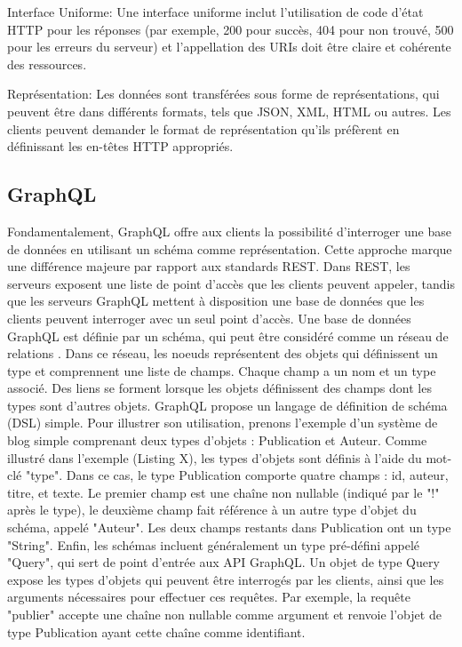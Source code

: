 Interface Uniforme: Une interface uniforme inclut l'utilisation de code d'état HTTP pour les réponses (par exemple, 200 pour succès, 404 pour non trouvé, 500 pour les erreurs du serveur) et l'appellation des URIs doit être claire et cohérente des ressources.

Représentation: Les données sont transférées sous forme de représentations, qui peuvent être dans différents formats, tels que JSON, XML, HTML ou autres. Les clients peuvent demander le format de représentation qu'ils préfèrent en définissant les en-têtes HTTP appropriés.

\subsection{GraphQL}

Fondamentalement, GraphQL offre aux clients la possibilité d'interroger une base de données en utilisant un schéma comme représentation. Cette approche marque une différence majeure par rapport aux standards REST. Dans REST, les serveurs exposent une liste de point d'accès que les clients peuvent appeler, tandis que les serveurs GraphQL mettent à disposition une base de données que les clients peuvent interroger avec un seul point d'accès. Une base de données GraphQL est définie par un schéma, qui peut être considéré comme un réseau de relations \cite{hartig2017initial}. Dans ce réseau, les noeuds représentent des objets qui définissent un type et comprennent une liste de champs. Chaque champ a un nom et un type associé. Des liens se forment lorsque les objets définissent des champs dont les types sont d'autres objets. GraphQL propose un langage de définition de schéma (DSL) simple. Pour illustrer son utilisation, prenons l'exemple d'un système de blog simple comprenant deux types d'objets : Publication et Auteur. Comme illustré dans l'exemple (Listing X), les types d'objets sont définis à l'aide du mot-clé "type". Dans ce cas, le type Publication comporte quatre champs : id, auteur, titre, et texte. Le premier champ est une chaîne non nullable (indiqué par le "!" après le type), le deuxième champ fait référence à un autre type d'objet du schéma, appelé "Auteur". Les deux champs restants dans Publication ont un type "String". Enfin, les schémas incluent généralement un type pré-défini appelé "Query", qui sert de point d'entrée aux API GraphQL. Un objet de type Query expose les types d'objets qui peuvent être interrogés par les clients, ainsi que les arguments nécessaires pour effectuer ces requêtes. Par exemple, la requête "publier" accepte une chaîne non nullable comme argument et renvoie l'objet de type Publication ayant cette chaîne comme identifiant. \cite{Brito2019}

